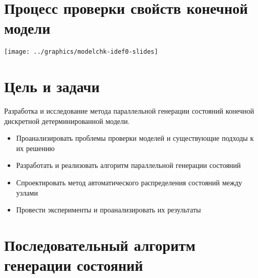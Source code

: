 \documentclass[12pt]{article}
\begin{document}
\TitleSlide

\section{Процесс проверки свойств конечной модели}
\label{sec:modelchk-idef0}

\begin{center}
  \texttt{[image: ../graphics/modelchk-idef0-slides]}
\end{center}

\section{Цель и задачи}
\label{sec:goal-tasks}

Разработка и исследование метода параллельной генерации состояний конечной дискретной
детерминированной модели.

\small {
  \begin{itemize}
  \item Проанализировать проблемы проверки моделей и существующие подходы к их решению
  \item Разработать и реализовать алгоритм параллельной генерации состояний
  \item Спроектировать метод автоматического распределения состояний между узлами
  \item Провести эксперименты и проанализировать их результаты
  \end{itemize}
}

\section{Последовательный алгоритм генерации состояний}
\label{sec:seq-stategen}
\end{document}
